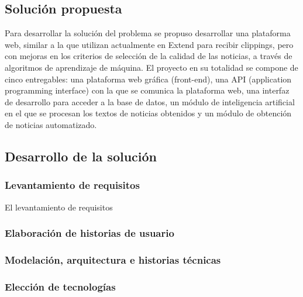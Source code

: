 \subsection{Solución propuesta}

Para desarrollar la solución del problema se propuso desarrollar una plataforma web, similar a la que utilizan actualmente en Extend para recibir clippings, pero con mejoras en los criterios de selección de la calidad de las noticias, a través de algoritmos de aprendizaje de máquina. El proyecto en su totalidad se compone de cinco entregables: una plataforma web gráfica (front-end), una API (application programming interface) con la que se comunica la plataforma web, una interfaz de desarrollo para acceder a la base de datos, un módulo de inteligencia artificial en el que se procesan los textos de noticias obtenidos y un módulo de obtención de noticias automatizado.

\subsection{Desarrollo de la solución}

\subsubsection{Levantamiento de requisitos}

El levantamiento de requisitos

\subsubsection{Elaboración de historias de usuario}

\subsubsection{Modelación, arquitectura e historias técnicas}

\subsubsection{Elección de tecnologías}

